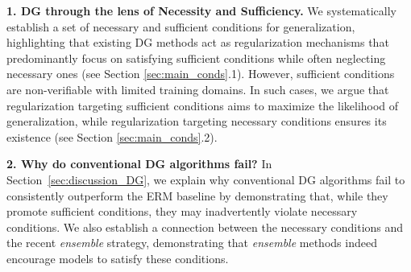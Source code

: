 \textbf{1. DG through the lens of Necessity and Sufficiency.} We systematically establish a set of necessary and sufficient conditions for generalization, highlighting that existing DG methods act as regularization mechanisms that predominantly focus on satisfying sufficient conditions while often neglecting necessary ones (see Section \ref{sec:main_conds}.1). However, sufficient conditions are non-verifiable with limited training domains. In such cases, we argue that regularization targeting sufficient conditions aims to maximize the likelihood of generalization, while regularization targeting necessary conditions ensures its existence (see Section \ref{sec:main_conds}.2). %



\textbf{2. Why do conventional DG algorithms fail?} In Section~\ref{sec:discussion_DG}, we explain why conventional DG algorithms fail to consistently outperform the ERM baseline by demonstrating that, while they promote sufficient conditions, they may inadvertently violate necessary conditions.
We also establish a connection between the necessary conditions and the recent \textit{ensemble} strategy, demonstrating that \textit{ensemble} methods indeed encourage models to satisfy these conditions.

  

